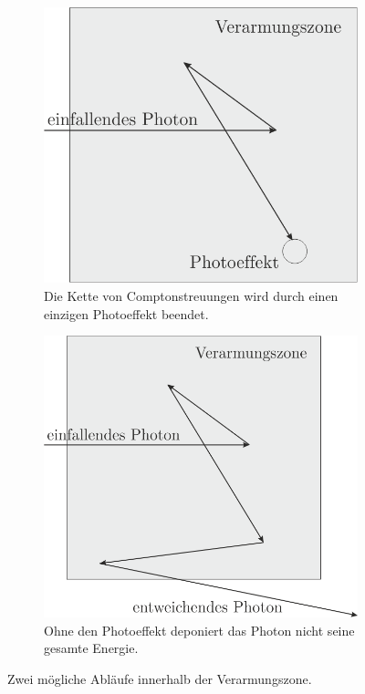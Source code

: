 \begin{figure}
    \centering
    \begin{subfigure}[b]{0.475\textwidth}
        \centering
        \includegraphics[width=\textwidth]{ressources/vorgaenge2.png}
        \caption[]%
        {{\small Die Kette von Comptonstreuungen wird durch einen einzigen Photoeffekt beendet.}}
        \label{fig:vorgaenge1}
    \end{subfigure}
    \hfill
    \begin{subfigure}[b]{0.475\textwidth}
        \centering
        \includegraphics[width=\textwidth]{ressources/vorgaenge1.png}
        \caption[]%
        {{\small Ohne den Photoeffekt deponiert das Photon nicht seine gesamte Energie.}}
        \label{fig:vorgaenge2}
    \end{subfigure}
    \caption[]
    {Zwei mögliche Abläufe innerhalb der Verarmungszone.}
    \label{fig:vorgaenge}
\end{figure}
